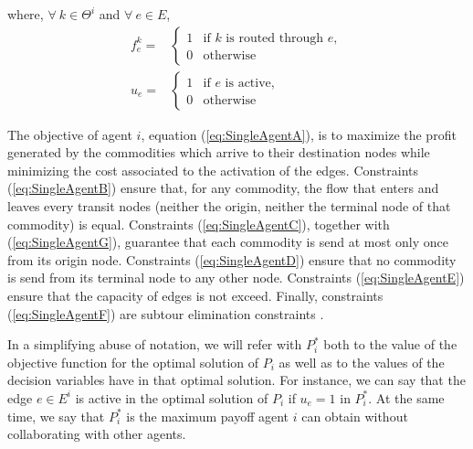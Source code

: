 \documentclass{article}
\begin{document}
where, $\forall\ k\in \Theta^i$ and  $\forall\ e \in E$,
\[
\begin{array}{rl}
f_e^k = & \begin{cases}
    1 & \text{if } k \text{ is routed through } e,\\
    0 & \text{otherwise}
\end{cases}  \\[20pt]
u_e = &\begin{cases}
    1 & \text{if } e \text{ is active},\\
    0 & \text{otherwise}    
\end{cases}
\end{array}
\]

The objective of agent $i$, equation (\ref{eq:SingleAgentA}), is to maximize the
profit generated by the commodities which arrive to their destination nodes
while minimizing the cost associated to the activation of the edges. Constraints
(\ref{eq:SingleAgentB}) ensure that, for any commodity, the flow that enters
and leaves every transit nodes (neither the origin, neither the terminal node of
that commodity) is equal. Constraints (\ref{eq:SingleAgentC}), together with
(\ref{eq:SingleAgentG}), guarantee that each commodity is send at most only once
from its origin node. Constraints (\ref{eq:SingleAgentD}) ensure that no
commodity is send from its terminal node to any other node. Constraints (\ref{eq:SingleAgentE})
ensure that the capacity of edges is not exceed. Finally, constraints
(\ref{eq:SingleAgentF}) are subtour elimination constraints \parencite{AHUJA1993}. 


In a simplifying abuse of notation, we will refer with $P_i^*$ both to the value of the objective function for the optimal solution of $P_i$ as well as to the values of the decision variables have in that optimal solution. For instance, we can say that the edge $e\in E^i$ is active in the optimal solution of $P_i$ if $u_e=1$ in $P_i^*$. At the same time, we say that $P_i^*$ is the maximum payoff agent $i$ can obtain without collaborating with other agents.
\end{document}
